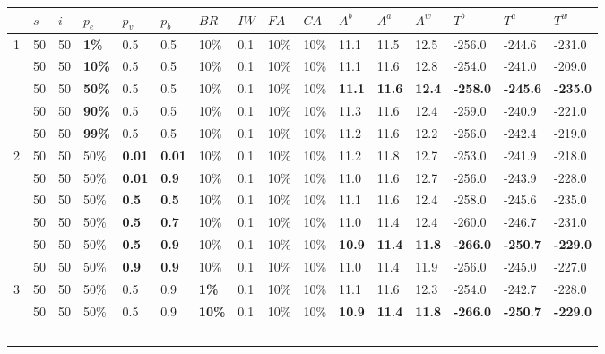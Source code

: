 \begin{table}
    \tiny
    \hspace*{-1cm}
	\begin{tabular}{|l|l|l|l|l|l|l|l|l|l||l|l|l|l|l|l|}
 	\hline
 	~ & $s$ & $i$ & $p_{e}$ & $p_{v}$ & $p_{b}$ & $BR$ &$IW$ & $FA$ & $CA$ & $A^b$ & $A^a$ & $A^w$ & $T^b$ & $T^a$ & $T^w$\\
 	\hline
    1 & 50 & 50 & \textbf{1\%} & 0.5 & 0.5 & 10\% & 0.1 & 10\% & 10\% & 11.1 & 11.5 & 12.5 & -256.0 &-244.6 & -231.0  \\
    ~ & 50 & 50 & \textbf{10\%} & 0.5 & 0.5 & 10\% & 0.1 & 10\% & 10\% & 11.1 & 11.6 & 12.8 & -254.0 & -241.0 & -209.0 \\
    ~ & 50 & 50 & \textbf{50\%} & 0.5 & 0.5 & 10\% & 0.1 & 10\% & 10\% & \textbf{11.1} & \textbf{11.6} & \textbf{12.4} & \textbf{-258.0} & \textbf{-245.6} & \textbf{-235.0}\\
    ~ & 50 & 50 & \textbf{90\%} & 0.5 & 0.5 & 10\% & 0.1 & 10\% & 10\% &  11.3 & 11.6 & 12.4 & -259.0 & -240.9 & -221.0  \\
    ~ & 50 & 50 & \textbf{99\%} & 0.5 & 0.5 & 10\% & 0.1 & 10\% & 10\% &  11.2 & 11.6 & 12.2 & -256.0 & -242.4 & -219.0  \\
    \hline
    2 & 50 & 50 & 50\% & \textbf{0.01} & \textbf{0.01} & 10\% & 0.1 & 10\% & 10\% & 11.2 & 11.8 & 12.7 & -253.0 & -241.9 & -218.0  \\
    ~ & 50 & 50 & 50\% & \textbf{0.01} & \textbf{0.9} & 10\% & 0.1 & 10\% & 10\% &  11.0 & 11.6 & 12.7 & -256.0 & -243.9 & -228.0  \\
    ~ & 50 & 50 & 50\% & \textbf{0.5} & \textbf{0.5} & 10\% & 0.1 & 10\%& 10\% & 11.1 & 11.6 & 12.4 & -258.0 & -245.6 & -235.0 \\
    ~ & 50 & 50 & 50\% & \textbf{0.5} & \textbf{0.7} & 10\% & 0.1 & 10\% & 10\% &  11.0 & 11.4 & 12.4 & -260.0 & -246.7 & -231.0 \\
    ~ & 50 & 50 & 50\% & \textbf{0.5} & \textbf{0.9} & 10\% & 0.1 & 10\% & 10\% &  \textbf{10.9} & \textbf{11.4} & \textbf{11.8} & \textbf{-266.0} & \textbf{-250.7} & \textbf{-229.0} \\
    ~ & 50 & 50 & 50\% & \textbf{0.9} & \textbf{0.9} & 10\% & 0.1 & 10\% & 10\% &  11.0 & 11.4 & 11.9 & -256.0 & -245.0 & -227.0  \\
    \hline
    3 & 50 & 50 & 50\% & 0.5 & 0.9 & \textbf{1\%} & 0.1 & 10\% & 10\% & 11.1 & 11.6 & 12.3 & -254.0 & -242.7 & -228.0  \\
    ~ & 50 & 50 & 50\% & 0.5 & 0.9 & \textbf{10\%} & 0.1 & 10\% & 10\% &  \textbf{10.9} & \textbf{11.4} & \textbf{11.8} & \textbf{-266.0} & \textbf{-250.7} & \textbf{-229.0} \\\

\end{tabular}
\end{table}
